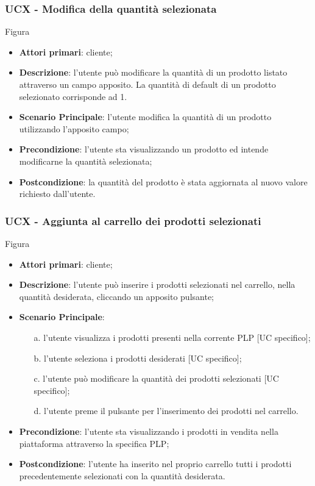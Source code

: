 \subsubsection{UCX - Modifica della quantità selezionata}
Figura \\
\begin{itemize}
\item \textbf{Attori primari}: cliente;
\item \textbf{Descrizione}: l'utente può modificare la quantità di un prodotto listato attraverso un campo apposito. La quantità di default di un prodotto selezionato corrisponde ad 1.
\item \textbf{Scenario Principale}: l'utente modifica la quantità di un prodotto utilizzando l'apposito campo;
\item \textbf{Precondizione}: l'utente sta visualizzando un prodotto ed intende modificarne la quantità selezionata;
\item \textbf{Postcondizione}: la quantità del prodotto è stata aggiornata al nuovo valore richiesto dall'utente.
\end{itemize}
\subsubsection{UCX - Aggiunta al carrello dei prodotti selezionati}
Figura \\
\begin{itemize}
\item \textbf{Attori primari}: cliente;
\item \textbf{Descrizione}: l'utente può inserire i prodotti selezionati nel carrello, nella quantità desiderata, cliccando un apposito pulsante;
\item \textbf{Scenario Principale}:
\begin{enumerate}
\item[a.] l'utente visualizza i prodotti presenti nella corrente PLP [UC specifico];
\item[b.] l'utente seleziona i prodotti desiderati [UC specifico];
\item[c.] l'utente può modificare la quantità dei prodotti selezionati [UC specifico];
\item[d.] l'utente preme il pulsante per l'inserimento dei prodotti nel carrello.
\end{enumerate}
\item \textbf{Precondizione}: l'utente sta visualizzando i prodotti in vendita nella piattaforma attraverso la specifica PLP;
\item \textbf{Postcondizione}: l'utente ha inserito nel proprio carrello tutti i prodotti precedentemente selezionati con la quantità desiderata.
\end{itemize}
